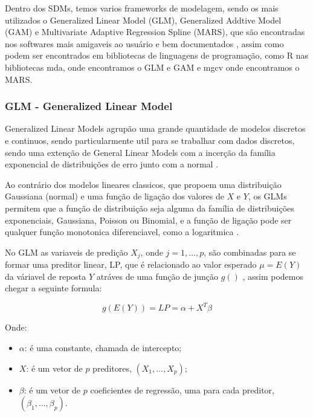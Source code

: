 \documentclass[
	12pt,				%
	openright,			%
	oneside,			%
	a4paper,			%
	english,			%
	brazil				%
	]{abntex2}
\begin{document}
Dentro dos SDMs, temos varios frameworks de modelagem, sendo os mais utilizados o Generalized Linear Model (GLM), 
Generalized Addtive Model (GAM) e Multivariate Adaptive Regression Spline (MARS), que são encontradas nos
softwares mais amigaveis ao usuário e bem documentados \cite{predPerform33models}, assim como podem ser encontrados em 
bibliotecas de linguagens de programação, como R nas bibliotecas mda, onde encontramos o GLM e GAM \cite{mda} e mgcv 
onde encontramos o MARS\cite{mgcv}.

\subsubsection{GLM - Generalized Linear Model}

Generalized Linear Models agrupão uma grande quantidade de modelos discretos e continuos, sendo particularmente util para se 
trabalhar com dados discretos, sendo uma extenção de General Linear Models com a incerção da família exponencial de 
distribuições de erro junto com a normal \cite{GLM}.

Ao contrário dos modelos lineares classicos, que propoem uma distribuição Gaussiana (normal) e uma função de ligação dos
valores de $X$ e $Y$, os GLMs permitem que a função de distribuição seja alguma da família de distribuições 
exponenciais, Gaussiana, Poisson ou Binomial, e a função de ligação pode ser qualquer função monotonica 
diferenciavel, como a logaritmica \cite{GAMeGLM_especie_estudo}.

No GLM as variaveis de predição $X_j$, onde $j = 1, ..., p$, são combinadas para se formar uma preditor linear, LP, que
é relacionado ao valor esperado $\mu = E(Y)$ da váriavel de reposta $Y$ atráves de uma função de junção $g()$ 
\cite{GAMeGLM_especie_estudo}, assim podemos chegar a seguinte formula: 

\begin{equation}
	g(E(Y)) = LP = \alpha + X^T \beta
\end{equation}

Onde:
\begin{itemize}
	\item $\alpha$: é uma constante, chamada de intercepto;
	\item $X$: é um vetor de $p$ preditores, $(X_1, ..., X_p)$;
	\item $\beta$: é um vetor de $p$ coeficientes de regressão, uma para cada preditor, $(\beta_1, ..., \beta_p)$.
\end{itemize}
\end{document}
